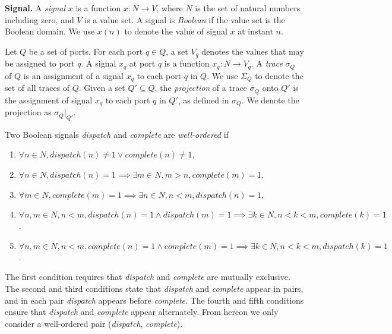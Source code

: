{\bf Signal.}
A \emph{signal} $x$ is a function $x: N \rightarrow V$, where $N$ is the set of natural numbers including zero, and $V$ is a value set. 
A signal is \emph{Boolean} if the value set is the Boolean domain.
We use $x(n)$ to denote the value of signal $x$ at instant $n$. 

Let $Q$ be a set of ports. 
For each port $q \in Q$, a set $V_q$ denotes the values that may be assigned to port $q$. %
A signal $x_q$ at port $q$ is a function $x_q: N \rightarrow V_q$.
A \emph{trace} $\sigma_Q$ of $Q$ is an assignment of a signal $x_q$ to each port $q$ in $Q$.
We use $\Sigma_Q$ to denote the set of all traces of $Q$.
Given a set $Q' \subseteq Q$, the \emph{projection} of a trace $\sigma_Q$ onto $Q'$ is the assignment of signal $x_q$ to each port $q$ in $Q'$, as defined in $\sigma_Q$. We denote the projection as $\sigma_Q|_{Q'}$.
 
Two Boolean signals \emph{dispatch} and \emph{complete} are \emph{well-ordered} if 

\begin{enumerate}
	\item $\forall n \in N, dispatch(n) \ne 1 \vee complete(n) \ne 1 $,
	\item $ \forall n\in N, dispatch(n) = 1 \implies \exists m\in N, m > n, complete(m) =  1 $,
	\item $ \forall m\in N, complete(m) = 1 \implies \exists n\in N, n < m, dispatch(n) =  1 $,
	\item $ \forall n,m\in N, n < m, dispatch(n) = 1 \wedge dispatch(m) = 1 \implies \exists k\in N, n < k < m, complete(k) = 1 $.
	\item $ \forall n,m\in N, n < m, complete(n) = 1 \wedge complete(m) = 1 \implies \exists k\in N, n < k < m, dispatch(k) = 1 $.
\end{enumerate}

The first condition requires that \emph{dispatch} and \emph{complete} are mutually exclusive. The second and third conditions state that \emph{dispatch} and \emph{complete} appear in pairs, and in each pair \emph{dispatch} appears before \emph{complete}. The fourth and fifth conditions ensure that \emph{dispatch} and \emph{complete} appear alternately. 
From hereon we only consider a well-ordered pair (\emph{dispatch}, \emph{complete}).

